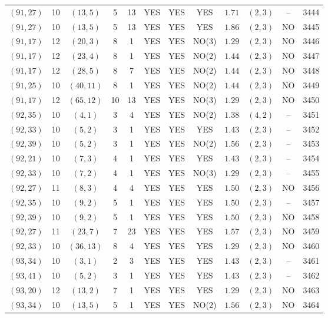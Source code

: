 \begin{longtable}{|c|c|c|c|c|c|c|c|c|c|c|c|}
$(91,27)$ & 10 & $(13,5)$ & 5 & 13 & YES & YES & YES & $1.71$ & $(2,3)$ & -- & 3444\\
$(91,27)$ & 10 & $(13,5)$ & 5 & 13 & YES & YES & YES & $1.86$ & $(2,3)$ & NO & 3445\\
$(91,17)$ & 12 & $(20,3)$ & 8 & 1 & YES & YES & NO(3) & $1.29$ & $(2,3)$ & NO & 3446\\
$(91,17)$ & 12 & $(23,4)$ & 8 & 1 & YES & YES & NO(2) & $1.44$ & $(2,3)$ & NO & 3447\\
$(91,17)$ & 12 & $(28,5)$ & 8 & 7 & YES & YES & NO(2) & $1.44$ & $(2,3)$ & NO & 3448\\
$(91,25)$ & 10 & $(40,11)$ & 8 & 1 & YES & YES & NO(2) & $1.44$ & $(2,3)$ & NO & 3449\\
$(91,17)$ & 12 & $(65,12)$ & 10 & 13 & YES & YES & NO(3) & $1.29$ & $(2,3)$ & NO & 3450\\
$(92,35)$ & 10 & $(4,1)$ & 3 & 4 & YES & YES & NO(2) & $1.38$ & $(4,2)$ & -- & 3451\\
$(92,33)$ & 10 & $(5,2)$ & 3 & 1 & YES & YES & YES & $1.43$ & $(2,3)$ & -- & 3452\\
$(92,39)$ & 10 & $(5,2)$ & 3 & 1 & YES & YES & NO(2) & $1.56$ & $(2,3)$ & -- & 3453\\
$(92,21)$ & 10 & $(7,3)$ & 4 & 1 & YES & YES & YES & $1.43$ & $(2,3)$ & -- & 3454\\
$(92,33)$ & 10 & $(7,2)$ & 4 & 1 & YES & YES & NO(3) & $1.29$ & $(2,3)$ & -- & 3455\\
$(92,27)$ & 11 & $(8,3)$ & 4 & 4 & YES & YES & YES & $1.50$ & $(2,3)$ & NO & 3456\\
$(92,35)$ & 10 & $(9,2)$ & 5 & 1 & YES & YES & YES & $1.50$ & $(2,3)$ & -- & 3457\\
$(92,39)$ & 10 & $(9,2)$ & 5 & 1 & YES & YES & YES & $1.50$ & $(2,3)$ & NO & 3458\\
$(92,27)$ & 11 & $(23,7)$ & 7 & 23 & YES & YES & YES & $1.57$ & $(2,3)$ & NO & 3459\\
$(92,33)$ & 10 & $(36,13)$ & 8 & 4 & YES & YES & YES & $1.29$ & $(2,3)$ & NO & 3460\\
$(93,34)$ & 10 & $(3,1)$ & 2 & 3 & YES & YES & YES & $1.43$ & $(2,3)$ & -- & 3461\\
$(93,41)$ & 10 & $(5,2)$ & 3 & 1 & YES & YES & YES & $1.43$ & $(2,3)$ & -- & 3462\\
$(93,20)$ & 12 & $(13,2)$ & 7 & 1 & YES & YES & YES & $1.29$ & $(2,3)$ & NO & 3463\\
$(93,34)$ & 10 & $(13,5)$ & 5 & 1 & YES & YES & NO(2) & $1.56$ & $(2,3)$ & NO & 3464\\

\end{longtable}
